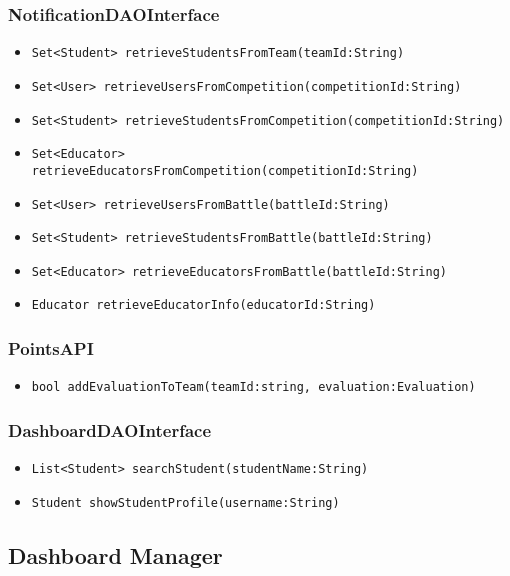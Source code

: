 \subsubsection{NotificationDAOInterface}
\begin{itemize}
    \item \texttt{Set<Student> retrieveStudentsFromTeam(teamId:String)}
    \item \texttt{Set<User> retrieveUsersFromCompetition(competitionId:String)}
    \item \texttt{Set<Student> retrieveStudentsFromCompetition(competitionId:String)}
    \item \texttt{Set<Educator> retrieveEducatorsFromCompetition(competitionId:String)}
    \item \texttt{Set<User> retrieveUsersFromBattle(battleId:String)}
    \item \texttt{Set<Student> retrieveStudentsFromBattle(battleId:String)}
    \item \texttt{Set<Educator> retrieveEducatorsFromBattle(battleId:String)}
    \item \texttt{Educator retrieveEducatorInfo(educatorId:String)}
\end{itemize}

\subsubsection{PointsAPI}
\begin{itemize}
    \item \texttt{bool addEvaluationToTeam(teamId:string, evaluation:Evaluation)}
\end{itemize}

\subsubsection{DashboardDAOInterface}
\begin{itemize}
    \item \texttt{List<Student> searchStudent(studentName:String)}
    \item \texttt{Student showStudentProfile(username:String)}
\end{itemize}

\subsection{Dashboard Manager}
